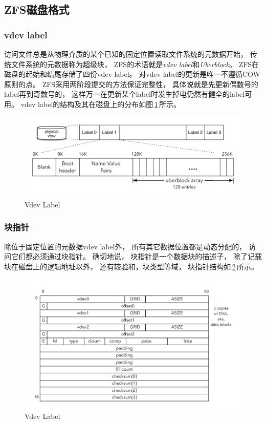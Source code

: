 \subsection{ZFS磁盘格式}
\subsubsection{vdev label}
访问文件总是从物理介质的某个已知的固定位置读取文件系统的元数据开始，
传统文件系统的元数据称为超级块，
ZFS的术语就是{\em vdev label}和{\em Uberblock}。
ZFS在磁盘的起始和结尾存储了四份vdev label。
对vdev label的更新是唯一不遵循COW原则的点。
ZFS采用两阶段提交的方法保证完整性，
具体说就是先更新偶数号的label再到奇数号的，
这样万一在更新某个label时发生掉电仍然有健全的label可用。
vdev label的结构及其在磁盘上的分布如图\,\ref{fig:vlabel}\,所示。

\begin{figure}[ht]
  \centering
  \includegraphics[width=\textwidth]{fig/zfs_vdev_label.pdf}
  \caption{Vdev Label}\label{fig:vlabel}
\end{figure}

\subsubsection{块指针}
除位于固定位置的元数据vdev label外，
所有其它数据位置都是动态分配的，
访问它们都必须通过块指针。
确切地说，
块指针是一个数据块的描述子，
除了记载块在磁盘上的逻辑地址以外，
还有较验和，块类型等域，
块指针结构如\,\ref{fig:blkptr}\,所示。

\begin{figure}[ht]
  \centering
  \includegraphics[width=\textwidth]{fig/zfs_blkptr.pdf}
  \caption{Vdev Label}\label{fig:blkptr}
\end{figure}

